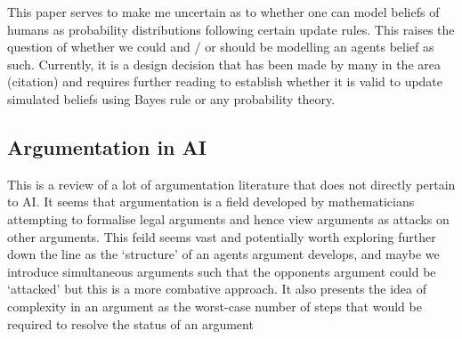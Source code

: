 This paper serves to make me uncertain as to whether one can model beliefs of humans as probability distributions following certain update rules. This raises the question of whether we could and / or should be modelling an agents belief as such. Currently, it is a design decision that has been made by many in the area (citation) and requires further reading to establish whether it is valid to update simulated beliefs using Bayes rule or any probability theory.

\subsection{Argumentation in AI\cite{Bench-Capon2007ArgumentationIntelligence}}

This is a review of a lot of argumentation literature that does not directly pertain to AI. It seems that argumentation is a field developed by mathematicians attempting to formalise legal arguments and hence view arguments as attacks on other arguments. This feild seems vast and potentially worth exploring further down the line as the `structure' of an agents argument develops, and maybe we introduce simultaneous arguments such that the opponents argument could be `attacked' but this is a more combative approach. It also presents the idea of complexity in an argument as the worst-case number of steps that would be required to resolve the status of an argument